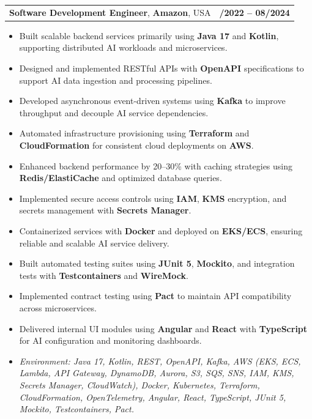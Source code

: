 \documentclass[letterpaper,11pt]{article}
\makeatletter
\newcommand{\resumeItem}[1]{
  \item\footnotesize{
    {#1 \vspace{-2pt}}
  }
}
\newcommand{\resumeSubheading}[4]{
  \vspace{-2pt}\item
    \begin{tabular*}{1.0\textwidth}[t]{l@{\extracolsep{\fill}}r}
      \textbf{\fontsize{10pt}{14pt}\selectfont #3}, \textbf{\fontsize{10pt}{14pt}\selectfont #1}, \fontsize{10pt}{14pt}\selectfont #4 & \textbf{\fontsize{10pt}{14pt}\selectfont #2} \\
    \end{tabular*}\vspace{-7pt}
}
\newcommand{\resumeItemListStart}{\begin{itemize}[leftmargin=*]}
\newcommand{\resumeItemListEnd}{\end{itemize}\vspace{-5pt}}
\makeatother
\begin{document}
\resumeSubheading
{Amazon}{10/2022 -- 08/2024}
{Software Development Engineer}{USA}
\resumeItemListStart
  \resumeItem{Built scalable backend services primarily using \textbf{Java 17} and \textbf{Kotlin}, supporting distributed AI workloads and microservices.}
  \resumeItem{Designed and implemented RESTful APIs with \textbf{OpenAPI} specifications to support AI data ingestion and processing pipelines.}
  \resumeItem{Developed asynchronous event-driven systems using \textbf{Kafka} to improve throughput and decouple AI service dependencies.}
  \resumeItem{Automated infrastructure provisioning using \textbf{Terraform} and \textbf{CloudFormation} for consistent cloud deployments on \textbf{AWS}.}
  \resumeItem{Enhanced backend performance by 20--30\% with caching strategies using \textbf{Redis/ElastiCache} and optimized database queries.}
  \resumeItem{Implemented secure access controls using \textbf{IAM}, \textbf{KMS} encryption, and secrets management with \textbf{Secrets Manager}.}
  \resumeItem{Containerized services with \textbf{Docker} and deployed on \textbf{EKS/ECS}, ensuring reliable and scalable AI service delivery.}
  \resumeItem{Built automated testing suites using \textbf{JUnit 5}, \textbf{Mockito}, and integration tests with \textbf{Testcontainers} and \textbf{WireMock}.}
  \resumeItem{Implemented contract testing using \textbf{Pact} to maintain API compatibility across microservices.}
  \resumeItem{Delivered internal UI modules using \textbf{Angular} and \textbf{React} with \textbf{TypeScript} for AI configuration and monitoring dashboards.}
  \resumeItem{\textit{Environment: Java 17, Kotlin, REST, OpenAPI, Kafka, AWS (EKS, ECS, Lambda, API Gateway, DynamoDB, Aurora, S3, SQS, SNS, IAM, KMS, Secrets Manager, CloudWatch), Docker, Kubernetes, Terraform, CloudFormation, OpenTelemetry, Angular, React, TypeScript, JUnit 5, Mockito, Testcontainers, Pact.}}
\resumeItemListEnd
\end{document}
